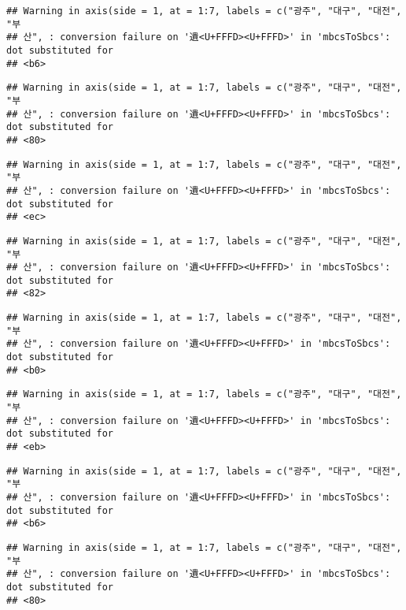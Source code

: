 \documentclass[]{article}
\begin{document}
\begin{verbatim}
## Warning in axis(side = 1, at = 1:7, labels = c("광주", "대구", "대전", "부
## 산", : conversion failure on '遺<U+FFFD><U+FFFD>' in 'mbcsToSbcs': dot substituted for
## <b6>
\end{verbatim}

\begin{verbatim}
## Warning in axis(side = 1, at = 1:7, labels = c("광주", "대구", "대전", "부
## 산", : conversion failure on '遺<U+FFFD><U+FFFD>' in 'mbcsToSbcs': dot substituted for
## <80>
\end{verbatim}

\begin{verbatim}
## Warning in axis(side = 1, at = 1:7, labels = c("광주", "대구", "대전", "부
## 산", : conversion failure on '遺<U+FFFD><U+FFFD>' in 'mbcsToSbcs': dot substituted for
## <ec>
\end{verbatim}

\begin{verbatim}
## Warning in axis(side = 1, at = 1:7, labels = c("광주", "대구", "대전", "부
## 산", : conversion failure on '遺<U+FFFD><U+FFFD>' in 'mbcsToSbcs': dot substituted for
## <82>
\end{verbatim}

\begin{verbatim}
## Warning in axis(side = 1, at = 1:7, labels = c("광주", "대구", "대전", "부
## 산", : conversion failure on '遺<U+FFFD><U+FFFD>' in 'mbcsToSbcs': dot substituted for
## <b0>
\end{verbatim}

\begin{verbatim}
## Warning in axis(side = 1, at = 1:7, labels = c("광주", "대구", "대전", "부
## 산", : conversion failure on '遺<U+FFFD><U+FFFD>' in 'mbcsToSbcs': dot substituted for
## <eb>
\end{verbatim}

\begin{verbatim}
## Warning in axis(side = 1, at = 1:7, labels = c("광주", "대구", "대전", "부
## 산", : conversion failure on '遺<U+FFFD><U+FFFD>' in 'mbcsToSbcs': dot substituted for
## <b6>
\end{verbatim}

\begin{verbatim}
## Warning in axis(side = 1, at = 1:7, labels = c("광주", "대구", "대전", "부
## 산", : conversion failure on '遺<U+FFFD><U+FFFD>' in 'mbcsToSbcs': dot substituted for
## <80>
\end{verbatim}
\end{document}

